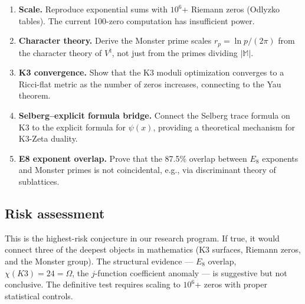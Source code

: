 \documentclass[11pt]{amsart}
\theoremstyle{definition}
\begin{document}
\begin{enumerate}[label=\textbf{P\arabic*.}]
\item \textbf{Scale.} Reproduce exponential sums with $10^6$+ Riemann zeros (Odlyzko tables). The current 100-zero computation has insufficient power.
\item \textbf{Character theory.} Derive the Monster prime scales $r_p = \ln p/(2\pi)$ from the character theory of $V^\natural$, not just from the primes dividing $|\mathbb{M}|$.
\item \textbf{K3 convergence.} Show that the K3 moduli optimization converges to a Ricci-flat metric as the number of zeros increases, connecting to the Yau theorem.
\item \textbf{Selberg--explicit formula bridge.} Connect the Selberg trace formula on K3 to the explicit formula for $\psi(x)$, providing a theoretical mechanism for K3-Zeta duality.
\item \textbf{E8 exponent overlap.} Prove that the 87.5\% overlap between $E_8$ exponents and Monster primes is not coincidental, e.g., via discriminant theory of sublattices.
\end{enumerate}

\subsection{Risk assessment}

This is the highest-risk conjecture in our research program. If true, it would connect three of the deepest objects in mathematics (K3 surfaces, Riemann zeros, and the Monster group). The structural evidence --- $E_8$ overlap, $\chi(K3) = 24 = \Omega$, the $j$-function coefficient anomaly --- is suggestive but not conclusive. The definitive test requires scaling to $10^6$+ zeros with proper statistical controls.
\end{document}
